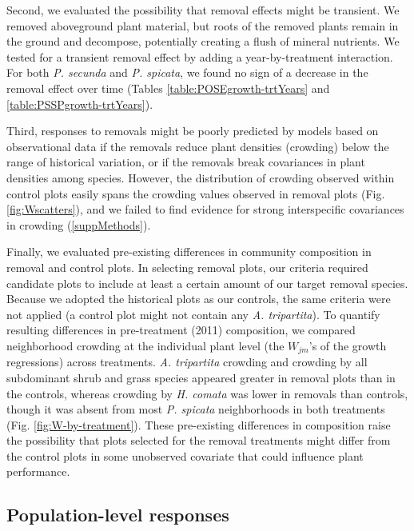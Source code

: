 \documentclass[11pt]{article}
\begin{document}
\begin{doublespacing}
Second, we evaluated the possibility that removal effects might be transient. We removed aboveground plant material, but roots of the removed plants remain in the ground and decompose, potentially creating a flush of mineral nutrients. We tested for a transient removal effect by adding a year-by-treatment interaction. For both  \textit{P. secunda}  and \textit{P. spicata}, we found no sign of a decrease in the removal effect over time (Tables \ref{table:POSEgrowth-trtYears} and \ref{table:PSSPgrowth-trtYears}).

Third, responses to removals might be poorly predicted by models based on observational data if the removals reduce plant densities (crowding) below the range of historical variation, or if the removals break covariances in plant densities among species. However, the distribution of crowding observed within control plots easily spans the crowding values observed in removal plots (Fig. \ref{fig:Wscatters}), and we failed to find evidence for strong interspecific covariances in crowding (\ref{suppMethods}).

Finally, we evaluated pre-existing differences in community composition in removal and control plots. In selecting removal plots, our criteria required candidate plots to include at least a certain amount of our target removal species. Because we adopted the historical plots as our controls, the same criteria were not applied (a control plot might not contain any \textit{A. tripartita}). To quantify resulting differences in pre-treatment (2011) composition, we compared neighborhood crowding at the individual plant level (the $W_{jm}$'s of the growth regressions) across treatments. \textit{A. tripartita} crowding and crowding by all subdominant shrub and grass species appeared greater in removal plots than in the controls, whereas crowding by \textit{H. comata} was lower in removals than controls, though it was absent from most \textit{P. spicata} neighborhoods in both treatments (Fig. \ref{fig:W-by-treatment}). These pre-existing differences in composition raise the possibility that plots selected for the removal treatments might differ from the control plots in some unobserved covariate that could influence plant performance.

\subsection*{Population-level responses}


\end{doublespacing}
\end{document}
